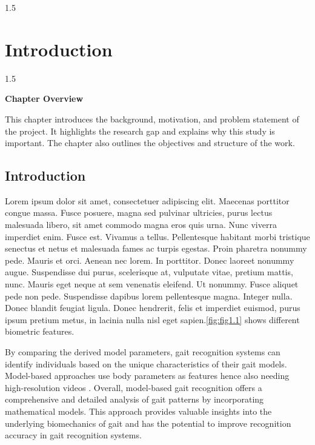 \documentclass[A4paper,12pt]{report}
\theoremstyle{plain}
\theoremstyle{definition}
\theoremstyle{remark}
\numberwithin{equation}{section}
\begin{document}
\begin{spacing}{1.5}
\chapter{Introduction}
\thispagestyle{empty}
\newpage
\setlength{\parindent}{0pt}
\end{spacing}

\begin{spacing}{1.5}

\thispagestyle{empty}

{\centering \Large \bfseries Chapter Overview \par}
\vspace{1cm} %

This chapter introduces the background, motivation, and problem
statement of the project. It highlights the research gap and explains
why this study is important. The chapter also outlines the objectives
and structure of the work.

\end{spacing}


\section{Introduction}
Lorem ipsum dolor sit amet, consectetuer adipiscing elit. Maecenas porttitor congue massa. Fusce posuere, magna sed pulvinar ultricies, purus lectus malesuada libero, sit amet commodo magna eros quis urna. Nunc viverra imperdiet enim. Fusce est. Vivamus a tellus. Pellentesque habitant morbi tristique senectus et netus et malesuada fames ac turpis egestas. Proin pharetra nonummy pede. Mauris et orci. Aenean nec lorem. In porttitor. Donec laoreet nonummy augue. Suspendisse dui purus, scelerisque at, vulputate vitae, pretium mattis, nunc. Mauris eget neque at sem venenatis eleifend. Ut nonummy. Fusce aliquet pede non pede. Suspendisse dapibus lorem pellentesque magna. Integer nulla. Donec blandit feugiat ligula. Donec hendrerit, felis et imperdiet euismod, purus ipsum pretium metus, in lacinia nulla nisl eget sapien.\ref{fig:fig1.1} shows different biometric features.






By comparing the derived model parameters, gait recognition systems can identify individuals based on the unique characteristics of their gait models. Model-based approaches use body parameters as features hence also needing high-resolution videos \cite{P}. Overall, model-based gait recognition offers a comprehensive and detailed analysis of gait patterns by incorporating mathematical models. This approach provides valuable insights into the underlying biomechanics of gait and has the potential to improve recognition accuracy in gait recognition systems.
\end{document}
